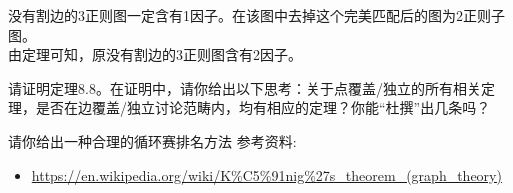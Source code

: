 \documentclass[a4paper, justified]{tufte-handout}
\begin{document}
\begin{solution}
没有割边的3正则图一定含有1因子。在该图中去掉这个完美匹配后的图为$2$正则子图。\\
由定理可知，原没有割边的3正则图含有2因子。
\end{solution}

\beginot
\begin{ot}[点独立与点覆盖]
	请证明定理8.8。在证明中，请你给出以下思考：关于点覆盖/独立的所有相关定理，是否在边覆盖/独立讨论范畴内，均有相应的定理？你能“杜撰”出几条吗？
	
\end{ot}


\begin{ot}	
请你给出一种合理的循环赛排名方法
\noindent 参考资料:
  \begin{itemize}
     \item \href{https://en.wikipedia.org/wiki/K\%C5\%91nig\%27s_theorem_(graph_theory)}{https://en.wikipedia.org/wiki/K\%C5\%91nig\%27s\_theorem\_(graph\_theory)}
  \end{itemize}
		
\end{ot}





% 




\beginfb

% 
% 
\end{document}
